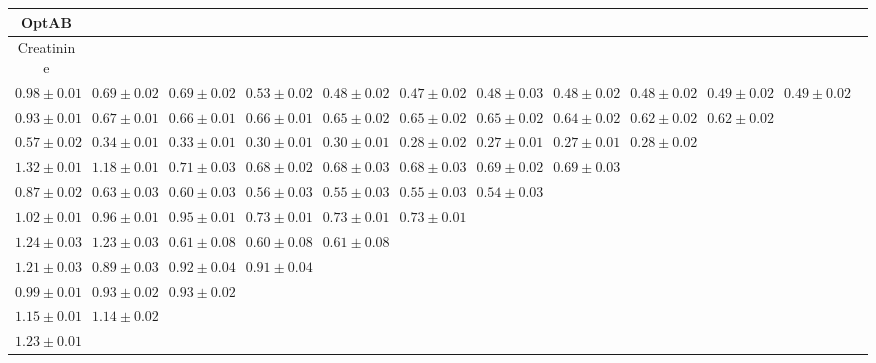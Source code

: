 \begin{table}[ht]
{{\begin{adjustbox}{width=\textwidth}
\begin{tabular}{cccccccccccc}
\hline
OptAB &  &  &  &  &  &  &  &  &  & \\
\hline
Creatinine &  &  &  &  &  &  &  &  &  & \\
\hline
$0.98 \pm 0.01$ & $0.69 \pm 0.02$ & $0.69 \pm 0.02$ & $0.53 \pm 0.02$ & $0.48 \pm 0.02$ & $0.47 \pm 0.02$ & $0.48 \pm 0.03$ & $0.48 \pm 0.02$ & $0.48 \pm 0.02$ & $0.49 \pm 0.02$ & $0.49 \pm 0.02$ &  \\
$0.93 \pm 0.01$ & $0.67 \pm 0.01$ & $0.66 \pm 0.01$ & $0.66 \pm 0.01$ & $0.65 \pm 0.02$ & $0.65 \pm 0.02$ & $0.65 \pm 0.02$ & $0.64 \pm 0.02$ & $0.62 \pm 0.02$ & $0.62 \pm 0.02$ &  &  \\
$0.57 \pm 0.02$ & $0.34 \pm 0.01$ & $0.33 \pm 0.01$ & $0.30 \pm 0.01$ & $0.30 \pm 0.01$ & $0.28 \pm 0.02$ & $0.27 \pm 0.01$ & $0.27 \pm 0.01$ & $0.28 \pm 0.02$ &  &  &  \\
$1.32 \pm 0.01$ & $1.18 \pm 0.01$ & $0.71 \pm 0.03$ & $0.68 \pm 0.02$ & $0.68 \pm 0.03$ & $0.68 \pm 0.03$ & $0.69 \pm 0.02$ & $0.69 \pm 0.03$ &  &  &  &  \\
$0.87 \pm 0.02$ & $0.63 \pm 0.03$ & $0.60 \pm 0.03$ & $0.56 \pm 0.03$ & $0.55 \pm 0.03$ & $0.55 \pm 0.03$ & $0.54 \pm 0.03$ &  &  &  &  &  \\
$1.02 \pm 0.01$ & $0.96 \pm 0.01$ & $0.95 \pm 0.01$ & $0.73 \pm 0.01$ & $0.73 \pm 0.01$ & $0.73 \pm 0.01$ &  &  &  &  &  &  \\
$1.24 \pm 0.03$ & $1.23 \pm 0.03$ & $0.61 \pm 0.08$ & $0.60 \pm 0.08$ & $0.61 \pm 0.08$ &  &  &  &  &  &  &  \\
$1.21 \pm 0.03$ & $0.89 \pm 0.03$ & $0.92 \pm 0.04$ & $0.91 \pm 0.04$ &  &  &  &  &  &  &  &  \\
$0.99 \pm 0.01$ & $0.93 \pm 0.02$ & $0.93 \pm 0.02$ &  &  &  &  &  &  &  &  &  \\
$1.15 \pm 0.01$ & $1.14 \pm 0.02$ &  &  &  &  &  &  &  &  &  &  \\
$1.23 \pm 0.01$ &  &  &  &  &  &  &  &  &  &  &  \\



\end{tabular}
\end{adjustbox}}}
\end{table}
